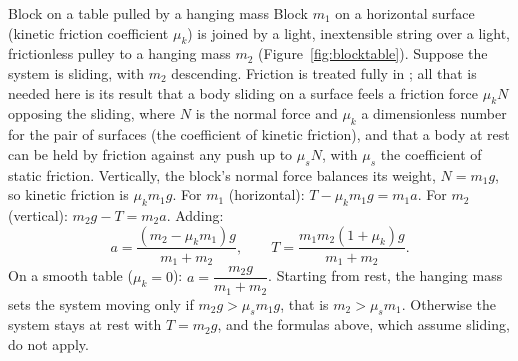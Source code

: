 \begin{figure}[htbp]
\centering
{}
\end{figure}

\begin{derivbox}{Block on a table pulled by a hanging mass}
Block $m_1$ on a horizontal surface (kinetic friction coefficient $\mu_k$) is joined by a light,
inextensible string over a light, frictionless pulley to a hanging mass $m_2$ (Figure~\ref{fig:blocktable}). Suppose the system is
sliding, with $m_2$ descending. Friction is treated fully in ; all that is needed
here is its result that a body sliding on a surface feels a friction force $\mu_kN$ opposing the sliding,
where $N$ is the normal force and $\mu_k$ a dimensionless number for the pair of surfaces (the
coefficient of kinetic friction), and that a body at rest can be held by friction against any push up
to $\mu_sN$, with $\mu_s$ the coefficient of static friction. Vertically, the block's normal force
balances its weight, $N=m_1g$, so kinetic friction is $\mu_k m_1g$.
For $m_1$ (horizontal): $T-\mu_k m_1 g=m_1 a$. For $m_2$ (vertical): $m_2 g-T=m_2 a$. Adding:
\[
a=\frac{(m_2-\mu_k m_1)g}{m_1+m_2},\qquad T=\frac{m_1 m_2(1+\mu_k)g}{m_1+m_2}.
\]
On a smooth table ($\mu_k=0$): $a=\dfrac{m_2 g}{m_1+m_2}$. Starting from rest, the hanging mass sets the
system moving only if $m_2g>\mu_s m_1g$, that is $m_2>\mu_s m_1$. Otherwise the
system stays at rest with $T=m_2g$, and the formulas above, which assume sliding, do not apply.
\end{derivbox}

\begin{figure}[htbp]
\centering
{}
\end{figure}

